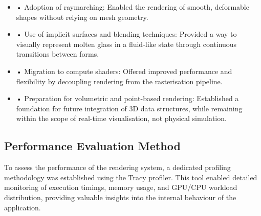 \documentclass{rapportcs}
\begin{document}
    \begin{itemize}
        \item[\hspace{0cm}] • Adoption of raymarching: Enabled the rendering of smooth, deformable shapes without relying on mesh geometry.\\
        
        \item[\hspace{0cm}] • Use of implicit surfaces and blending techniques: Provided a way to visually represent molten glass in a fluid-like state through continuous transitions between forms.\\
        
        \item[\hspace{0cm}] • Migration to compute shaders: Offered improved performance and flexibility by decoupling rendering from the rasterisation pipeline.\\
        
        \item[\hspace{0cm}] • Preparation for volumetric and point-based rendering: Established a foundation for future integration of 3D data structures, while remaining within the scope of real-time visualisation, not physical simulation.\\
        
    \end{itemize}

\newpage


\subsection{Performance Evaluation Method}
    To assess the performance of the rendering system, a dedicated profiling methodology was established using the Tracy profiler. This tool enabled detailed monitoring of execution timings, memory usage, and GPU/CPU workload distribution, providing valuable insights into the internal behaviour of the application.\\
\end{document}

